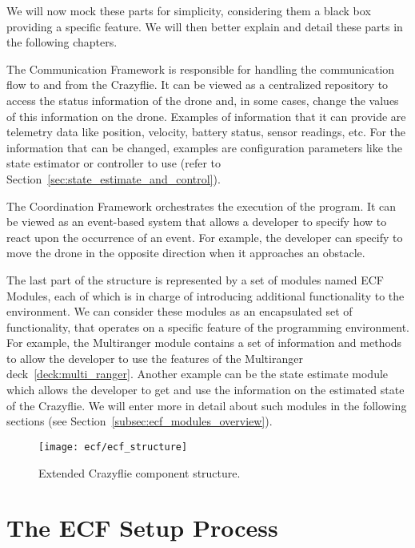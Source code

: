 We will now mock these parts for simplicity, considering them a black box providing a specific feature.
We will then better explain and detail these parts in the following chapters.

The Communication Framework is responsible for handling the communication flow to and from the Crazyflie.
It can be viewed as a centralized repository to access the status information of the drone and, in some cases, change the values of this information on the drone.
Examples of information that it can provide are telemetry data like position, velocity, battery status, sensor readings, etc. 
For the information that can be changed, examples are configuration parameters like the state estimator or controller to use (refer to Section~\ref{sec:state_estimate_and_control}).

The Coordination Framework orchestrates the execution of the program. 
It can be viewed as an event-based system that allows a developer to specify how to react upon the occurrence of an event.
For example, the developer can specify to move the drone in the opposite direction when it approaches an obstacle.

The last part of the structure is represented by a set of modules named ECF Modules, each of which is in charge of introducing additional functionality to the environment.
We can consider these modules as an encapsulated set of functionality, that operates on a specific feature of the programming environment.
For example, the Multiranger module contains a set of information and methods to allow the developer to use the features of the Multiranger deck~\ref{deck:multi_ranger}.
Another example can be the state estimate module which allows the developer to get and use the information on the estimated state of the Crazyflie.
We will enter more in detail about such modules in the following sections (see Section~\ref{subsec:ecf_modules_overview}).
 
\begin{SCfigure}[\sidecaptionrelwidth][tb]
    \texttt{[image: ecf/ecf\_structure]}
    \caption{Extended Crazyflie component structure.}\label{fig:ecf_structure}
\end{SCfigure}

\pagebreak%

\section{The ECF Setup Process}\label{sec:ecf_setup_process}

